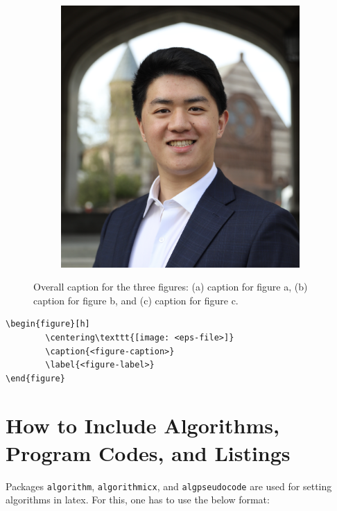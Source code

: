 \documentclass[12pt,a4paper]{article}
\begin{document}
\begin{figure}[!ht]
\begin{subfigure}{0.3\textwidth}
        \caption{}
    \end{subfigure}
    \hfill
    \begin{subfigure}{0.3\textwidth}
        \includegraphics[width=\linewidth]{figures/cat_momo_1.png}
        \caption{}
    \end{subfigure}
    \caption{Overall caption for the three figures: (a) caption for figure a, (b) caption for figure b, and (c) caption for figure c.}
    \label{fig:multi_figs}
\end{figure}


\begin{verbatim}
\begin{figure}[h]
        \centering\texttt{[image: <eps-file>]}
        \caption{<figure-caption>}
        \label{<figure-label>}
\end{figure}
\end{verbatim}


\section{How to Include Algorithms, Program Codes, and Listings}\label{sec8}
Packages \verb+algorithm+, \verb+algorithmicx+, and \verb+algpseudocode+ are used for setting algorithms in latex.
For this, one has to use the below format:
\end{document}
